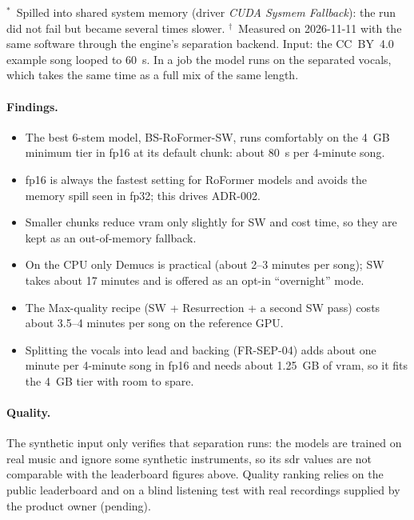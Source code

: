 \documentclass{covermaker}
\begin{document}
$^{*}$~Spilled into shared system memory (driver \emph{CUDA Sysmem Fallback}):
the run did not fail but became several times slower.
$^{\dagger}$~Measured on 2026-11-11 with the same software through the
engine's separation backend. Input: the CC~BY~4.0 example song looped to
60~s. In a job the model runs on the separated vocals, which takes the same
time as a full mix of the same length.

\paragraph{Findings.}
\begin{itemize}
  \item The best 6-stem model, BS-RoFormer-SW, runs comfortably on the 4~GB
        minimum tier in fp16 at its default chunk: about 80~s per 4-minute song.
  \item fp16 is always the fastest setting for RoFormer models and avoids the
        memory spill seen in fp32; this drives ADR-002.
  \item Smaller chunks reduce \gls{vram} only slightly for SW and cost time, so
        they are kept as an out-of-memory fallback.
  \item On the CPU only Demucs is practical (about 2--3 minutes per song); SW
        takes about 17 minutes and is offered as an opt-in ``overnight'' mode.
  \item The Max-quality recipe (SW + Resurrection + a second SW pass) costs
        about 3.5--4 minutes per song on the reference GPU.
  \item Splitting the vocals into lead and backing (FR-SEP-04) adds about one
        minute per 4-minute song in fp16 and needs about 1.25~GB of
        \gls{vram}, so it fits the 4~GB tier with room to spare.
\end{itemize}

\paragraph{Quality.} The synthetic input only verifies that separation runs: the
models are trained on real music and ignore some synthetic instruments, so its
\gls{sdr} values are not comparable with the leaderboard figures above. Quality
ranking relies on the public leaderboard and on a blind listening test with
real recordings supplied by the product owner (pending).

\printnoidxglossaries
\end{document}
